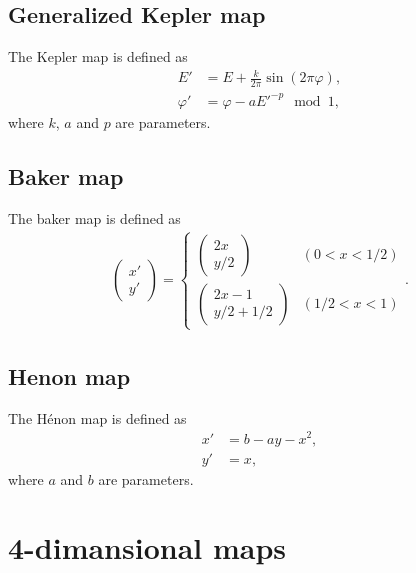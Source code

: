 \documentclass{article}
\begin{document}
\subsection*{Generalized Kepler map}
The Kepler map is defined as
\begin{align*}
E'&=E+\frac{k}{2\pi}\sin(2\pi \varphi),\\
\varphi'&=\varphi-aE'^{-p}\mod 1,
\end{align*}
where $k$, $a$ and $p$ are parameters.

\subsection*{Baker map}
The baker map is defined as
\begin{align*}
\begin{pmatrix}
x'\\y'
\end{pmatrix}
=
\begin{cases}
\begin{pmatrix}
2x\\y/2
\end{pmatrix}
&(0<x<1/2)\\
\begin{pmatrix}
2x-1\\y/2+1/2
\end{pmatrix}
&(1/2<x<1)
\end{cases}.
\end{align*}

\subsection*{Henon map}
The H\'enon map is defined as
\begin{align*}
x'&=b-ay-x^2,\\
y'&=x,
\end{align*}
where $a$ and $b$ are parameters.

\section*{4-dimansional maps}
\end{document}
